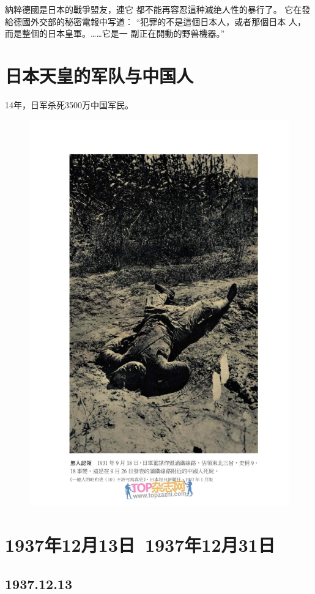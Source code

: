 \documentclass[12pt,UTF8]{ctexbook}
\begin{document}
納粹德國是日本的戰爭盟友，連它
都不能再容忍這种滅绝人性的暴行了。
它在發給德國外交部的秘密電報中写道：
“犯罪的不是這個日本人，或者那個日本
人，而是整個的日本皇軍。……它是一
副正在開動的野兽機器。”

\mainmatter

\chapter{日本天皇的军队与中国人}

14年，日军杀死3500万中国军民。

\begin{figure}[htbp]
	\centering
	\includegraphics[width=0.7\linewidth]{1}
	\caption{}
	\label{fig:1}
\end{figure}



\chapter{1937年12月13日~1937年12月31日}

\section{1937.12.13}
\end{document}
